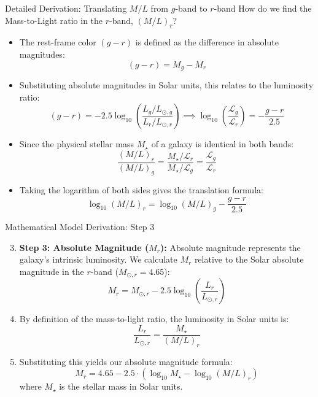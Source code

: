 \documentclass[9pt]{beamer}
\begin{document}
\begin{frame}{Detailed Derivation: Translating $M/L$ from $g$-band to $r$-band}
  How do we find the Mass-to-Light ratio in the $r$-band, $(M/L)_r$?
  \begin{itemize}
    \item The rest-frame color $(g-r)$ is defined as the difference in absolute magnitudes:
      $$(g-r) = M_g - M_r$$
    \item Substituting absolute magnitudes in Solar units, this relates to the luminosity ratio:
      $$(g-r) = -2.5 \log_{10} \left( \frac{L_g / L_{\odot, g}}{L_r / L_{\odot, r}} \right) \implies \log_{10} \left( \frac{\mathcal{L}_g}{\mathcal{L}_r} \right) = -\frac{g-r}{2.5}$$
    \item Since the physical stellar mass $M_\star$ of a galaxy is identical in both bands:
      $$\frac{(M/L)_r}{(M/L)_g} = \frac{M_\star / \mathcal{L}_r}{M_\star / \mathcal{L}_g} = \frac{\mathcal{L}_g}{\mathcal{L}_r}$$
    \item Taking the logarithm of both sides gives the translation formula:
      $$\log_{10}(M/L)_r = \log_{10}(M/L)_g - \frac{g-r}{2.5}$$
  \end{itemize}
\end{frame}

\begin{frame}{Mathematical Model Derivation: Step 3}
  \begin{enumerate}
    \setcounter{enumi}{2}
    \item \textbf{Step 3: Absolute Magnitude ($M_r$):}
      Absolute magnitude represents the galaxy's intrinsic luminosity. We calculate $M_r$ relative to the Solar absolute magnitude in the $r$-band ($M_{\odot, r} = 4.65$):
      $$M_r = M_{\odot, r} - 2.5 \log_{10} \left( \frac{L_r}{L_{\odot, r}} \right)$$
    \item By definition of the mass-to-light ratio, the luminosity in Solar units is:
      $$\frac{L_r}{L_{\odot, r}} = \frac{M_\star}{(M/L)_r}$$
    \item Substituting this yields our absolute magnitude formula:
      $$M_r = 4.65 - 2.5 \cdot \left( \log_{10} M_\star - \log_{10}(M/L)_r \right)$$
      where $M_\star$ is the stellar mass in Solar units.
  \end{enumerate}
\end{frame}
\end{document}
